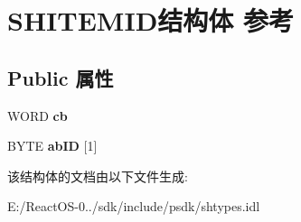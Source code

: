 \hypertarget{struct_s_h_i_t_e_m_i_d}{}\section{S\+H\+I\+T\+E\+M\+I\+D结构体 参考}
\label{struct_s_h_i_t_e_m_i_d}
\subsection*{Public 属性}
\begin{DoxyCompactItemize}
\item 
\mbox{\label{struct_s_h_i_t_e_m_i_d_ab698f8963881e219ccbe266cdb5fe5ee}} 
W\+O\+RD {\bfseries cb}
\item 
\mbox{\label{struct_s_h_i_t_e_m_i_d_a6e2213a4fe4dcc5485494eded468bb6d}} 
B\+Y\+TE {\bfseries ab\+ID} \mbox{[}1\mbox{]}
\end{DoxyCompactItemize}


该结构体的文档由以下文件生成\+:\begin{DoxyCompactItemize}
\item 
E\+:/\+React\+O\+S-\/0../sdk/include/psdk/shtypes.\+idl\end{DoxyCompactItemize}
